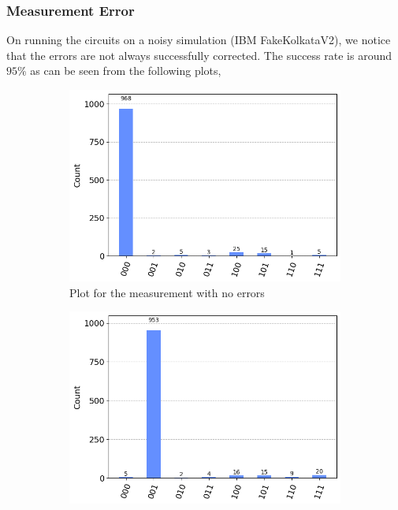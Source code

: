 \documentclass[11pt]{article}
\begin{document}
\subsubsection{Measurement Error}
On running the circuits on a noisy simulation (IBM FakeKolkataV2), we notice that the errors are not always successfully corrected. The success rate is around $95\%$ as can be seen from the following plots,
\begin{figure}[h!]
    \begin{subfigure}{0.5\linewidth}
        \includegraphics[width=\linewidth]{outputs/measure_3_none.png}
        \caption{Plot for the measurement with no errors}
    \end{subfigure}
    \begin{subfigure}{0.5\linewidth}
        \includegraphics[width=\linewidth]{outputs/measure_3_0.png}

\end{subfigure}
\end{figure}
\end{document}
